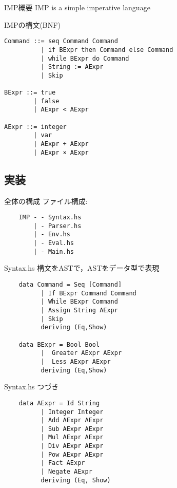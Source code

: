 \documentclass[uplatex,dvipdfmx,ja=standard]{beamer}
\begin{document}
\begin{frame}{IMP概要}
    \Large IMP is a simple imperative language 
\end{frame}

\begin{frame}[fragile]{IMPの構文(BNF)}
    \begin{verbatim}
Command ::= seq Command Command 
          | if BExpr then Command else Command
          | while BExpr do Command
          | String := AExpr
          | Skip

BExpr ::= true
        | false
        | AExpr < AExpr

AExpr ::= integer 
        | var
        | AExpr + AExpr
        | AExpr × AExpr
    \end{verbatim}
\end{frame}

\subsection{実装}

\begin{frame}[fragile]{全体の構成}
    ファイル構成:
    \begin{verbatim}
    IMP - - Syntax.hs
        | - Parser.hs 
        | - Env.hs
        | - Eval.hs
        | - Main.hs
    \end{verbatim}
\end{frame}

\begin{frame}[fragile]{Syntax.hs}
    構文をASTで，ASTをデータ型で表現
    \begin{verbatim}
    data Command = Seq [Command]
          | If BExpr Command Command
          | While BExpr Command 
          | Assign String AExpr
          | Skip
          deriving (Eq,Show)

    data BExpr = Bool Bool
          |  Greater AExpr AExpr
          |  Less AExpr AExpr
          deriving (Eq,Show)
    \end{verbatim}
\end{frame}

\begin{frame}[fragile]{Syntax.hs}
    つづき
    \begin{verbatim}
    data AExpr = Id String 
          | Integer Integer
          | Add AExpr AExpr
          | Sub AExpr AExpr
          | Mul AExpr AExpr
          | Div AExpr AExpr
          | Pow AExpr AExpr
          | Fact AExpr
          | Negate AExpr
          deriving (Eq, Show)
    \end{verbatim}
\end{frame}
\end{document}
